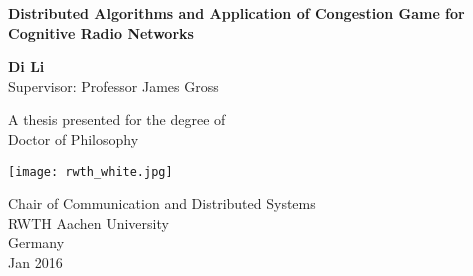 


\begin{titlepage}
    \begin{center}
        \vspace*{1cm}
        
        \Huge
        \textbf{Distributed Algorithms and Application of Congestion Game for Cognitive Radio Networks}
        
        
        \vspace{1.5cm}
        
        \textbf{Di Li}\\
        \vspace{.5cm}
        \LARGE
        Supervisor: Professor James Gross
        
        \vfill
        
        A thesis presented for the degree of\\
        Doctor of Philosophy
        
        \vspace{0.8cm}
        
        \texttt{[image: rwth\_white.jpg]}
        
        \Large
        Chair of Communication and Distributed Systems\\
        RWTH Aachen University\\
        Germany\\
        Jan 2016
        \vspace{1.5cm}
        
    \end{center}
\end{titlepage}